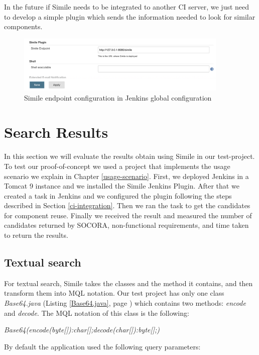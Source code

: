 In the future if Simile needs to be integrated to another CI server, we just need to develop a simple plugin which sends the information needed to look for similar components.

\begin{figure}[H]
	\centering
    \includegraphics[width=0.9\textwidth]{grafiken/simile-conf-02}
    \caption{Simile endpoint configuration in Jenkins global configuration}
    \label{fig:simile-conf-02}
\end{figure}

\section{Search Results}
In this section we will evaluate the results obtain using Simile in our test-project. To test our proof-of-concept we used a project that implements the usage scenario we explain in Chapter \ref{usage-scenario}. First, we deployed Jenkins in a Tomcat 9 instance and we installed the Simile Jenkins Plugin. After that we created a task in Jenkins and we configured the plugin following the steps described in Section \ref{ci-integration}. Then we ran the task to get the candidates for component reuse. Finally we received the result and measured the number of candidates returned by SOCORA, non-functional requirements, and time taken to return the results.

\subsection{Textual search}
For textual search, Simile takes the classes and the method it contains, and then transform them into MQL notation. Our test project has only one class \emph{Base64.java} (Listing \ref{Base64.java}, page \pageref{Base64.java}) which contains two methods: \emph{encode} and \emph{decode}. The MQL notation of this class is the following:

\begin{displayquote}
\emph{Base64(encode(byte[]):char[];decode(char[]):byte[];)}
\end{displayquote}

By default the application used the following query parameters:

